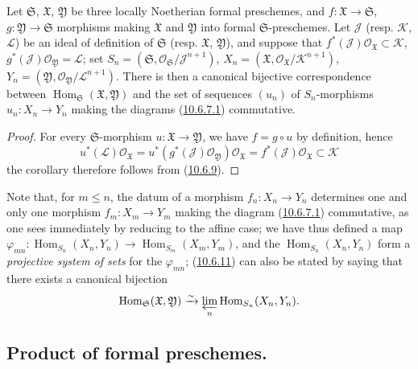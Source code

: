 \begin{corollary}[10.6.11]
\label{I.10.6.11}
Let $\mathfrak{S}$, $\mathfrak{X}$, $\mathfrak{Y}$ be three locally
Noetherian formal preschemes, and
$f:\mathfrak{X}\to\mathfrak{S}$,
$g:\mathfrak{Y}\to\mathfrak{S}$ morphisms making
$\mathfrak{X}$ and $\mathfrak{Y}$ into formal $\mathfrak{S}$-preschemes.
Let $\mathscr{J}$ \textup{(resp. $\mathscr{K}$, $\mathscr{L}$)} be an
ideal of definition of $\mathfrak{S}$ \textup{(resp. $\mathfrak{X}$,
$\mathfrak{Y}$)}, and suppose that
$f^*(\mathscr{J})\mathscr{O}_{\mathfrak{X}}\subset\mathscr{K}$,
$g^*(\mathscr{J})\mathscr{O}_{\mathfrak{Y}}=\mathscr{L}$; set
$S_n=(\mathfrak{S},
\mathscr{O}_{\mathfrak{S}}/\mathscr{J}^{n+1})$,
$X_n=(\mathfrak{X},
\mathscr{O}_{\mathfrak{X}}/\mathscr{K}^{n+1})$,
$Y_n=(\mathfrak{Y},
\mathscr{O}_{\mathfrak{Y}}/\mathscr{L}^{n+1})$. There is then a
canonical bijective
correspondence between
$\operatorname{Hom}_{\mathfrak{S}}(\mathfrak{X},\mathfrak{Y})$ and
the set of sequences $(u_n)$ of $S_n$-morphisms
$u_n:X_n\to Y_n$ making the diagrams
\textup{(\hyperref[I.10.6.7.1]{10.6.7.1})} commutative.
\end{corollary}

\begin{proof}
For every $\mathfrak{S}$-morphism
$u:\mathfrak{X}\to\mathfrak{Y}$, we have $f=g\circ u$ by definition, hence
\[
  u^*(\mathscr{L})\mathscr{O}_{\mathfrak{X}}
  =u^*(g^*(\mathscr{J})\mathscr{O}_{\mathfrak{Y}})
    \mathscr{O}_{\mathfrak{X}}
  =f^*(\mathscr{J})\mathscr{O}_{\mathfrak{X}}
  \subset\mathscr{K}
\]
the corollary therefore follows from
(\hyperref[I.10.6.9]{10.6.9}).
\end{proof}

Note that, for $m\leq n$, the datum of a morphism
$f_n:X_n\to Y_n$ determines one and only one morphism
$f_m:X_m\to Y_m$ making the diagram
(\hyperref[I.10.6.7.1]{10.6.7.1}) commutative, as one sees
immediately by reducing to the affine case; we have thus defined a map
$\varphi_{mn}:\operatorname{Hom}_{S_n}(X_n,Y_n)
\to\operatorname{Hom}_{S_m}(X_m,Y_m)$, and the
$\operatorname{Hom}_{S_n}(X_n,Y_n)$ form a
\emph{projective system of sets} for the $\varphi_{mn}$;
(\hyperref[I.10.6.11]{10.6.11}) can also be stated by saying that
there exists a canonical bijection
\[
  \operatorname{Hom}_{\mathfrak{S}}(\mathfrak{X},\mathfrak{Y})
  \xrightarrow{\sim}
  \varprojlim_n\operatorname{Hom}_{S_n}(X_n,Y_n).
\]

\subsection{Product of formal preschemes.}
\label{subsection:I.10.7}

